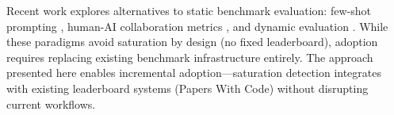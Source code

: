 
Recent work explores alternatives to static benchmark evaluation: few-shot prompting \citep{Brown2020FewShot}, human-AI collaboration metrics \citep{Bansal2021}, and dynamic evaluation \citep{Nie2020}. While these paradigms avoid saturation by design (no fixed leaderboard), adoption requires replacing existing benchmark infrastructure entirely. The approach presented here enables incremental adoption---saturation detection integrates with existing leaderboard systems (Papers With Code) without disrupting current workflows.
